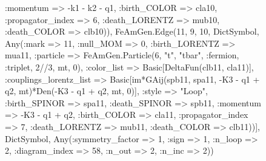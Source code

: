 \documentclass{revtex4}
\begin{document}
\begin{figure}[!htb]
\begin{center}
{:momentum => -k1 - k2 - q1, :birth_COLOR => cla10, :propagator_index => 6, :death_LORENTZ => mub10, :death_COLOR => clb10)), FeAmGen.Edge(11, 9, 10, Dict{Symbol, Any}(:mark => 11, :null_MOM => 0, :birth_LORENTZ => mua11, :particle => FeAmGen.Particle(6, "t", "tbar", :fermion, :triplet, 2//3, mt, 0), :color_list => Basic[DeltaFun(clb11, cla11)], :couplings_lorentz_list => Basic[im*GAij(spb11, spa11, -K3 - q1 + q2, mt)*Den(-K3 - q1 + q2, mt, 0)], :style => "Loop", :birth_SPINOR => spa11, :death_SPINOR => spb11, :momentum => -K3 - q1 + q2, :birth_COLOR => cla11, :propagator_index => 7, :death_LORENTZ => mub11, :death_COLOR => clb11))], Dict{Symbol, Any}(:symmetry_factor => 1, :sign => 1, :n_loop => 2, :diagram_index => 58, :n_out => 2, :n_inc => 2)) 
}
\end{center}
\end{figure}
\end{document}
